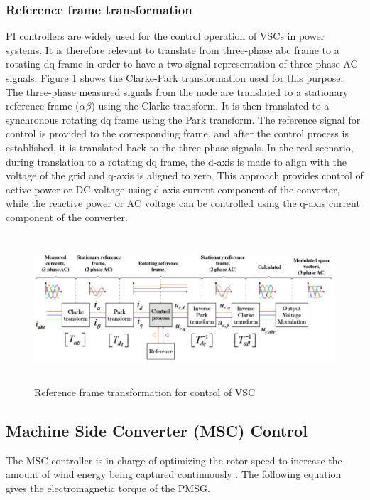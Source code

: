 \subsubsection{Reference frame transformation}\label{ref_frame_trafo}
\gls{PI} controllers are widely used for the control operation of \gls{VSC}s in power systems. It is therefore relevant to translate from three-phase abc frame to a rotating \gls{dq} frame in order to have a two signal representation of three-phase \gls{AC} signals. Figure \ref{fig:DQTransformation} shows the Clarke-Park transformation used for this purpose. The three-phase measured signals from the node are translated to a stationary reference frame ($\alpha \beta$) using the Clarke transform. It is then translated to a synchronous rotating \gls{dq} frame using the Park transform. The reference signal for control is provided to the corresponding frame, and after the control process is established, it is translated back to the three-phase signals. In the real scenario, during translation to a rotating \gls{dq} frame, the d-axis is made to align with the voltage of the grid and q-axis is aligned to zero. This approach provides control of active power or \gls{DC} voltage using d-axis current component of the converter, while the reactive power or \gls{AC} voltage can be controlled using the q-axis current component of the converter.   

\begin{figure}[H]
\centering
    \includegraphics[height = 5.5cm,width = 15.5cm]{Diagrams/Chapter_2/DQTransformation.pdf}
    \caption{Reference frame transformation for control of VSC \cite{ndreko2017offshore}}
    \label{fig:DQTransformation}
\end{figure}

\subsection{Machine Side Converter (MSC) Control}
The \gls{MSC} controller is in charge of optimizing the rotor speed to increase the amount of wind energy being captured continuously \cite{strachan_stability_2010}. %
The following equation gives the electromagnetic torque of the \gls{PMSG}.

